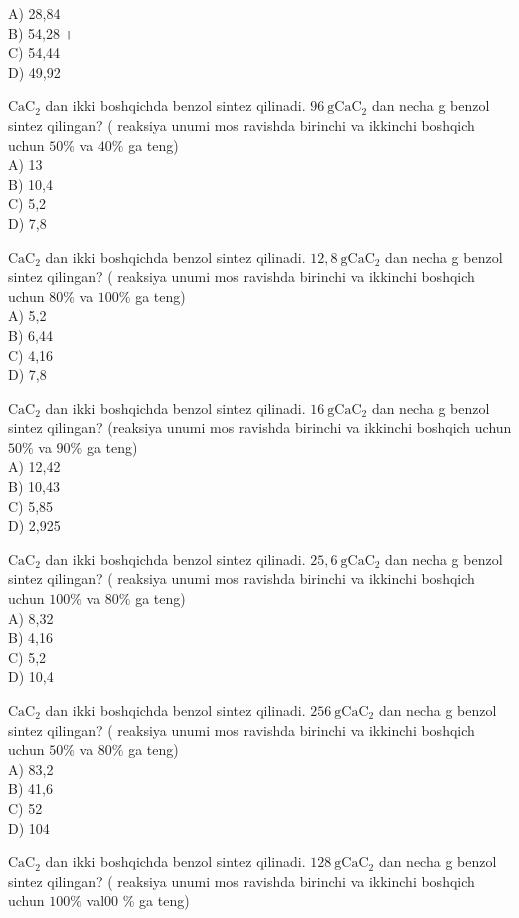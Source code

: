 A) 28,84\\
B) 54,28 ।\\
C) 54,44\\
D) 49,92
  \item $\mathrm{CaC}_{2}$ dan ikki boshqichda benzol sintez qilinadi. $96 \mathrm{~g} \mathrm{CaC}_{2}$ dan necha g benzol sintez qilingan? ( reaksiya unumi mos ravishda birinchi va ikkinchi boshqich uchun $50 \%$ va $40 \%$ ga teng)\\
A) 13\\
B) 10,4\\
C) 5,2\\
D) 7,8
  \item $\mathrm{CaC}_{2}$ dan ikki boshqichda benzol sintez qilinadi. $12,8 \mathrm{~g} \mathrm{CaC}_{2}$ dan necha g benzol sintez qilingan? ( reaksiya unumi mos ravishda birinchi va ikkinchi boshqich uchun $80 \%$ va $100 \%$ ga teng)\\
A) 5,2\\
B) 6,44\\
C) 4,16\\
D) 7,8
  \item $\mathrm{CaC}_{2}$ dan ikki boshqichda benzol sintez qilinadi. $16 \mathrm{~g} \mathrm{CaC}_{2}$ dan necha g benzol sintez qilingan? (reaksiya unumi mos ravishda birinchi va ikkinchi boshqich uchun $50 \%$ va $90 \%$ ga teng)\\
A) 12,42\\
B) 10,43\\
C) 5,85\\
D) 2,925
  \item $\mathrm{CaC}_{2}$ dan ikki boshqichda benzol sintez qilinadi. $25,6 \mathrm{~g} \mathrm{CaC}_{2}$ dan necha g benzol sintez qilingan? ( reaksiya unumi mos ravishda birinchi va ikkinchi boshqich uchun $100 \%$ va $80 \%$ ga teng)\\
A) 8,32\\
B) 4,16\\
C) 5,2\\
D) 10,4
  \item $\mathrm{CaC}_{2}$ dan ikki boshqichda benzol sintez qilinadi. $256 \mathrm{~g} \mathrm{CaC}_{2}$ dan necha g benzol sintez qilingan? ( reaksiya unumi mos ravishda birinchi va ikkinchi boshqich uchun $50 \%$ va $80 \%$ ga teng)\\
A) 83,2\\
B) 41,6\\
C) 52\\
D) 104
  \item $\mathrm{CaC}_{2}$ dan ikki boshqichda benzol sintez qilinadi. $128 \mathrm{~g} \mathrm{CaC}_{2}$ dan necha g benzol sintez qilingan? ( reaksiya unumi mos ravishda birinchi va ikkinchi boshqich uchun $100 \%$ val00 \% ga teng)\\
